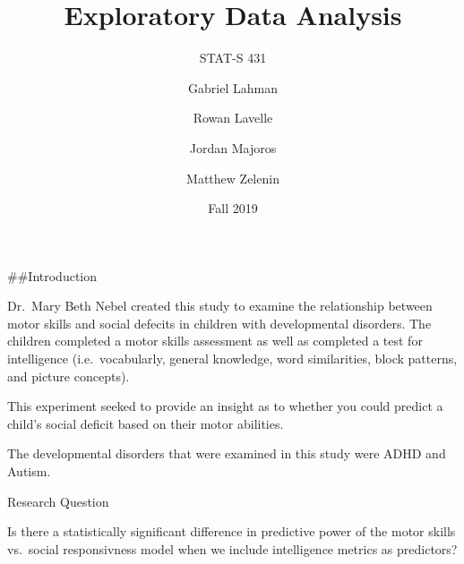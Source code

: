 \documentclass[12pt,ignorenonframetext,aspectratio=169]{beamer}
\title{Exploratory Data Analysis}
\subtitle{STAT-S 431}
\author{Gabriel Lahman \and Rowan Lavelle \and Jordan Majoros \and Matthew Zelenin}
\date{Fall 2019}
\begin{document}
\frame{\titlepage}

\begin{frame}

\#\#Introduction

Dr.~Mary Beth Nebel created this study to examine the relationship
between motor skills and social defecits in children with developmental
disorders. The children completed a motor skills assessment as well as
completed a test for intelligence (i.e.~vocabularly, general knowledge,
word similarities, block patterns, and picture concepts).

This experiment seeked to provide an insight as to whether you could
predict a child's social deficit based on their motor abilities.

The developmental disorders that were examined in this study were ADHD
and Autism.

\end{frame}

\begin{frame}{Research Question}
\protect\hypertarget{research-question}{}

Is there a statistically significant difference in predictive power of
the motor skills vs.~social responsivness model when we include
intelligence metrics as predictors?

\end{frame}
\end{document}
